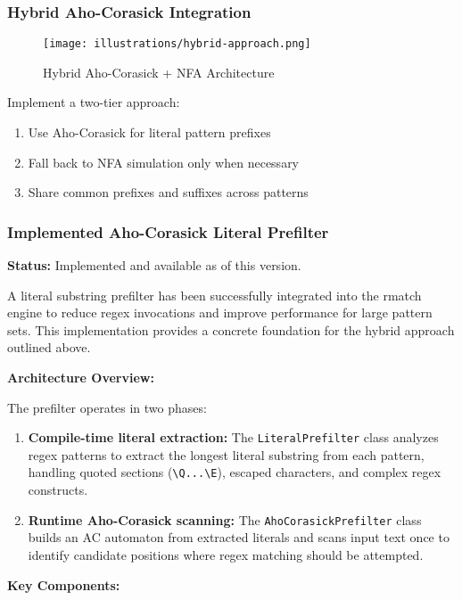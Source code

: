 \documentclass[11pt,a4paper]{article}
\begin{document}
\subsubsection{Hybrid Aho-Corasick Integration}

\begin{figure}[htbp]
\centering
\texttt{[image: illustrations/hybrid-approach.png]}
\caption{Hybrid Aho-Corasick + NFA Architecture}
\label{fig:hybrid}
\end{figure}

Implement a two-tier approach:
\begin{enumerate}
\item Use Aho-Corasick for literal pattern prefixes
\item Fall back to NFA simulation only when necessary
\item Share common prefixes and suffixes across patterns
\end{enumerate}

\subsubsection{Implemented Aho-Corasick Literal Prefilter}

\textbf{Status:} Implemented and available as of this version.

A literal substring prefilter has been successfully integrated into the rmatch engine to reduce regex invocations and improve performance for large pattern sets. This implementation provides a concrete foundation for the hybrid approach outlined above.

\textbf{Architecture Overview:}

The prefilter operates in two phases:
\begin{enumerate}
\item \textbf{Compile-time literal extraction:} The \texttt{LiteralPrefilter} class analyzes regex patterns to extract the longest literal substring from each pattern, handling quoted sections (\texttt{\textbackslash Q...\textbackslash E}), escaped characters, and complex regex constructs.
\item \textbf{Runtime Aho-Corasick scanning:} The \texttt{AhoCorasickPrefilter} class builds an AC automaton from extracted literals and scans input text once to identify candidate positions where regex matching should be attempted.
\end{enumerate}

\textbf{Key Components:}
\end{document}
